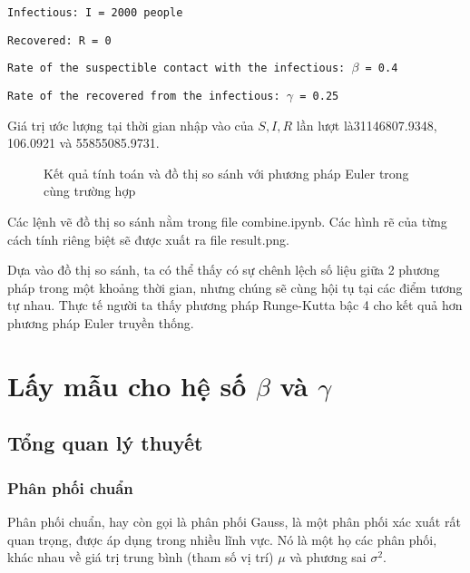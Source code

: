 \documentclass[a4paper]{article}
\begin{document}
\texttt{Infectious: I = 2000 people}

\texttt{Recovered: R = 0}

\texttt{Rate of the suspectible contact with the infectious: $\beta$ = 0.4}

\texttt{Rate of the recovered from the infectious: $\gamma$ = 0.25}

Giá trị ước lượng tại thời gian nhập vào của $S,I,R$ lần lượt là31146807.9348, 106.0921 và 55855085.9731.

\begin{figure}[h!]
    \centering
    \newline
    \newline
    \newline
    \label{pic: test_SIR_1}
    \caption{Kết quả tính toán và đồ thị so sánh với phương pháp Euler trong cùng trường hợp}
\end{figure}

Các lệnh vẽ đồ thị so sánh nằm trong file combine.ipynb. Các hình rẽ của từng cách tính riêng biệt sẽ được xuất ra file result.png.

Dựa vào đồ thị so sánh, ta có thể thấy có sự chênh lệch số liệu giữa 2 phương pháp trong một khoảng thời gian, nhưng chúng sẽ cùng hội tụ tại các điểm tương tự nhau. Thực tế người ta thấy phương pháp Runge-Kutta bậc 4 cho kết quả hơn phương pháp Euler truyền thống.

\newpage
\section{Lấy mẫu cho hệ số $ \beta$  và $ \gamma$}
\subsection{Tổng quan lý thuyết}
\subsubsection{Phân phối chuẩn}
Phân phối chuẩn, hay còn gọi là phân phối Gauss, là một phân phối xác xuất rất quan trọng, được áp dụng trong nhiều lĩnh vực. Nó là một họ các phân phối, khác nhau về giá trị trung bình (tham số vị trí) $\mu$ và phương sai $\sigma^2$. 
\end{document}
